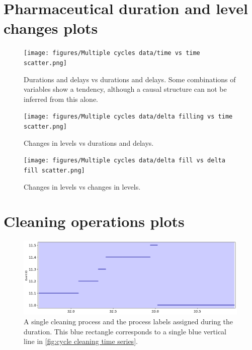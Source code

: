 \documentclass[../Thesis.tex]{subfiles}
\begin{document}
\section{Pharmaceutical duration and level changes plots}
\begin{figure}[H]
    \centering
    \begin{sideways}
        \texttt{[image: figures/Multiple cycles data/time vs time scatter.png]}
    \end{sideways}
    \caption{Durations and delays vs durations and delays. Some combinations of variables show a tendency, although a causal structure can not be inferred from this alone.}
    \label{fig:time vs time all}
\end{figure}
\newpage

\begin{figure}[H]
    \centering
    \begin{sideways}
        \texttt{[image: figures/Multiple cycles data/delta filling vs time scatter.png]}
    \end{sideways}
    \caption{Changes in levels vs durations and delays.}
    \label{fig:time vs level all}
\end{figure}
\newpage


\begin{figure}[H]
    \centering
    \begin{sideways}
        \texttt{[image: figures/Multiple cycles data/delta fill vs delta fill scatter.png]}
    \end{sideways}
    \caption{Changes in levels vs changes in levels.}
    \label{fig:level vs level all}
\end{figure}
\newpage




\section{Cleaning operations plots}
\begin{figure}[H]
    \centering
    \includegraphics[width=0.9\linewidth]{figures/Multiple cycles data/Cleaning batches timeseries single.png}
    \caption{A single cleaning process and the process labels assigned during the duration. This blue rectangle corresponds to a single blue vertical line in \autoref{fig:cycle cleaning time series}.}
    \label{fig:cycle cleaning time series single}
\end{figure}
\end{document}
